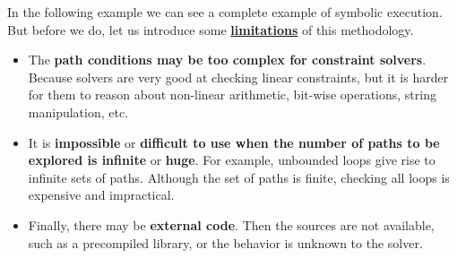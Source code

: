 \highspace
In the following example we can see a complete example of symbolic execution. But before we do, let us introduce some \underline{\textbf{limitations}} of this methodology.
\begin{itemize}
    \item The \textbf{path conditions may be too complex for constraint solvers}. Because solvers are very good at checking linear constraints, but it is harder for them to reason about non-linear arithmetic, bit-wise operations, string manipulation, etc.
    
    \item It is \textbf{impossible} or \textbf{difficult to use when the number of paths to be explored is infinite} or \textbf{huge}. For example, unbounded loops give rise to infinite sets of paths. Although the set of paths is finite, checking all loops is expensive and impractical.
    
    \item Finally, there may be \textbf{external code}. Then the sources are not available, such as a precompiled library, or the behavior is unknown to the solver.
\end{itemize}
